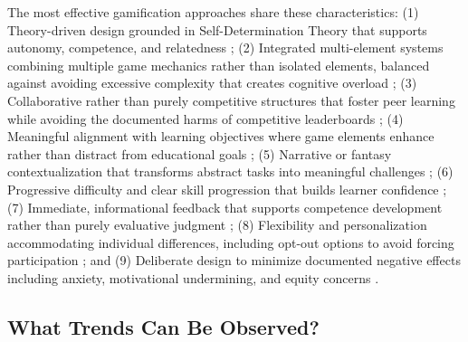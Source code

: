 \documentclass[12pt,a4paper]{article}
\begin{document}
The most effective gamification approaches share these characteristics: (1) Theory-driven design grounded in Self-Determination Theory that supports autonomy, competence, and relatedness \parencite{ryan2025,wu2024}; (2) Integrated multi-element systems combining multiple game mechanics rather than isolated elements, balanced against avoiding excessive complexity that creates cognitive overload \parencite{wu2024,rodriguez2025,wang2023,surendeleg2024}; (3) Collaborative rather than purely competitive structures that foster peer learning while avoiding the documented harms of competitive leaderboards \parencite{wu2024,sevilla2024,toda2022,surendeleg2024}; (4) Meaningful alignment with learning objectives where game elements enhance rather than distract from educational goals \parencite{ryan2025,rodriguez2025,toda2022,surendeleg2024}; (5) Narrative or fantasy contextualization that transforms abstract tasks into meaningful challenges \parencite{toda2022,wang2023,sevilla2024}; (6) Progressive difficulty and clear skill progression that builds learner confidence \parencite{wang2023,rodriguez2025}; (7) Immediate, informational feedback that supports competence development rather than purely evaluative judgment \parencite{ryan2025,wang2023}; (8) Flexibility and personalization accommodating individual differences, including opt-out options to avoid forcing participation \parencite{ryan2025,rodriguez2025,ojonuba2023,surendeleg2024}; and (9) Deliberate design to minimize documented negative effects including anxiety, motivational undermining, and equity concerns \parencite{surendeleg2024}.


\subsection{What Trends Can Be Observed?}
\end{document}
